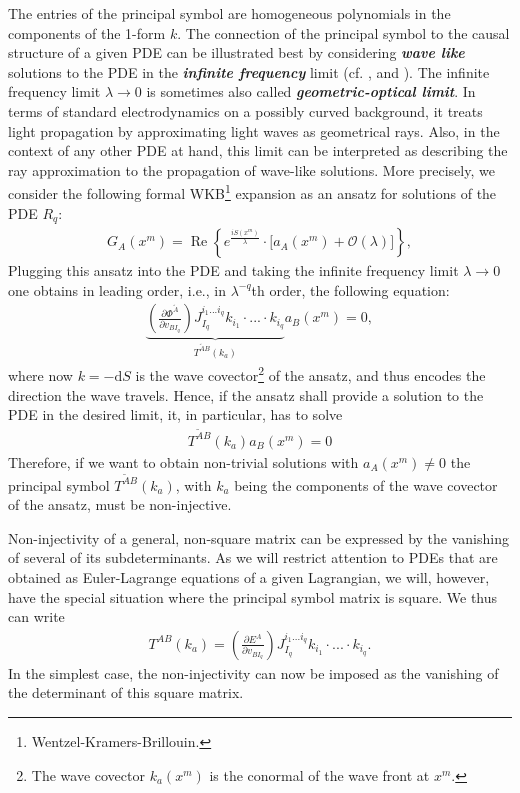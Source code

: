 The entries of the principal symbol are homogeneous polynomials in the components of the 1-form $k$.
The connection of the principal symbol to the causal structure of a given PDE can be illustrated best by considering \textit{\textbf{wave like}} solutions to the PDE in the \textit{\textbf{infinite frequency}} limit (cf. \cite{2012arXiv1211.1914K}, \cite{2011PhRvD..83d4047R} and \cite{2018PhRvD..97h4036D}). 
The infinite frequency limit $\lambda \rightarrow 0 $ is sometimes also called \textit{\textbf{geometric-optical limit}}. In terms of standard electrodynamics on a possibly curved background, it treats light propagation by approximating light waves as geometrical rays. Also, in the context of any other PDE at hand, this limit can be interpreted as describing the ray approximation to the propagation of wave-like solutions.
More precisely, we consider the following formal WKB\footnote{Wentzel-Kramers-Brillouin.} expansion as an ansatz for solutions of the PDE $R_q$:
\begin{align}\label{waveAns}
    G_A(x^m) = \operatorname{Re}\left \{ e^{\frac{iS(x^m)}{\lambda}} \cdot   \bigl [ a_A(x^m) + \mathcal{O}(\lambda) \bigr ]\right \},
\end{align}
Plugging this ansatz into the PDE and taking the infinite frequency limit $\lambda \rightarrow 0$ one obtains in leading order, i.e., in $\lambda^{-q}$th order, the following equation:
\begin{align}
    \underbrace{\left ( \frac{\partial \Phi^{\tilde{A}}}{\partial v_{BI_q}} \right ) J_{I_q}^{i_1...i_q} k_{i_1} \cdot ... \cdot k_{i_q}}_{T^{\tilde{A} B}(k_a)} a_B(x^m) = 0,
\end{align}
where now $k = -\mathrm{d}S$ is the wave covector\footnote{The wave covector $k_a(x^m)$ is the conormal of the wave front at $x^m$.} of the ansatz, and thus encodes the direction the wave travels. Hence, if the ansatz shall provide a solution to the PDE in the desired limit, it, in particular, has to solve 
\begin{align}\label{solvabilityCond}
    T^{\tilde{A} B}(k_a) a_B(x^m) = 0
\end{align} 
Therefore, if we want to obtain non-trivial solutions with $a_A(x^m) \neq 0$ the principal symbol
$T^{\tilde{A} B}(k_a)$, with $k_a$ being the components of the wave covector of the ansatz, must be non-injective.

Non-injectivity of a general, non-square matrix can be expressed by the vanishing of several of its subdeterminants. As we will restrict attention to PDEs that are obtained as Euler-Lagrange equations of a given Lagrangian, we will, however, have the special situation where the principal symbol matrix is square. We thus can write
\begin{align}
T^{A B}(k_a) =  \left ( \frac{\partial E^{A}}{\partial v_{BI_q}} \right ) J_{I_q}^{i_1...i_q} k_{i_1} \cdot ... \cdot k_{i_q}.
\end{align}
In the simplest case, the non-injectivity can now be imposed as the vanishing of the determinant of this square matrix.

